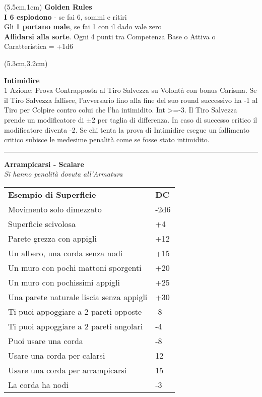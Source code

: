 \documentclass[a4paper,12 pt,openany]{book}
\newcommand{\riga}{\rule{\textwidth}{0.4pt}}
\begin{document}
\begin{textblock*}{14.5cm}(5.5cm,1cm) %
\textbf{Golden Rules}\\

{\textbf{I 6 esplodono}} - se fai 6, sommi e ritiri\\
Gli \textbf{1 portano male}, se fai 1 con il dado vale zero\\
\textbf{Affidarsi alla sorte}. Ogni 4 punti tra Competenza Base o Attiva o Caratteristica = +1d6\\
\end{textblock*}


\begin{textblock*}{7.4cm}(5.3cm,3.2cm) %

\textbf{Intimidire}\\
1 Azione: Prova Contrapposta al Tiro Salvezza su Volontà con bonus Carisma.
Se il Tiro Salvezza fallisce, l'avversario fino alla fine del suo round successivo ha -1 al Tiro per Colpire contro colui che l'ha intimidito. Int >=-3. Il Tiro Salvezza prende un modificatore di $\pm2$ per taglia di differenza. In caso di successo critico il modificatore diventa -2.  Se chi tenta la prova di Intimidire esegue un fallimento critico subisce le medesime penalità come se fosse stato intimidito.

\riga

\textbf{Arrampicarsi - Scalare}\\
\textit{Si hanno penalità dovuta all'Armatura}

\begin{tabular}{ll}
\textbf{Esempio di Superficie} & \textbf{DC}\\
Movimento solo dimezzato & -2d6\\
Superficie scivolosa&+4\\
Parete grezza con appigli&+12\\
Un albero, una corda senza nodi&+15\\
Un muro con pochi mattoni sporgenti &+20\\
Un muro con pochissimi appigli&+25\\
Una parete naturale liscia senza appigli&+30\\
Ti puoi appoggiare a 2 pareti opposte&-8\\
Ti puoi appoggiare a 2 pareti angolari&-4\\
Puoi usare una corda&-8\\
\hline
Usare una corda per calarsi&12\\
Usare una corda per arrampicarsi&15\\
La corda ha nodi & -3\\
\end{tabular}


\end{textblock*}
\end{document}
